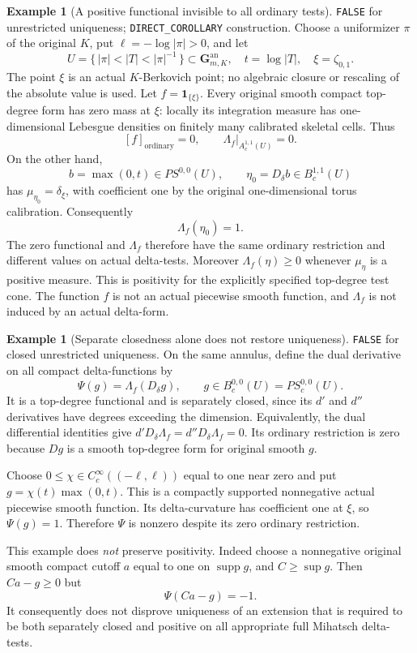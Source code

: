 \documentclass[11pt,a4paper]{article}
\numberwithin{equation}{section}
\theoremstyle{definition}
\newtheorem{example}[theorem]{Example}
\theoremstyle{remark}
\begin{document}
\begin{example}[A positive functional invisible to all ordinary tests]
\label{ex:r6-invisible-positive-delta-functional}
\textnormal{\texttt{FALSE} for unrestricted uniqueness;
\texttt{DIRECT\_COROLLARY} construction.}
Choose a uniformizer $\pi$ of the original $K$, put
$\ell=-\log|\pi|>0$, and let
\[
       U=\{\,|\pi|<|T|<|\pi|^{-1}\,\}\subset\mathbf G_{m,K}^{\mathrm{an}},
       \quad t=\log|T|,\quad \xi=\zeta_{0,1}.
\]
The point $\xi$ is an actual $K$-Berkovich point; no algebraic closure
or rescaling of the absolute value is used.  Let $f=\mathbf1_{\{\xi\}}$.
Every original smooth compact top-degree form has zero mass at
$\xi$: locally its integration measure has one-dimensional Lebesgue
densities on finitely many calibrated skeletal cells.  Thus
\[
                     [f]_{\mathrm{ordinary}}=0,
              \qquad \Lambda_f|_{A_c^{1,1}(U)}=0.
\]
On the other hand,
\[
           b=\max(0,t)\in PS^{0,0}(U),\qquad
           \eta_0=D_\delta b\in B_c^{1,1}(U)
\]
has $\mu_{\eta_0}=\delta_\xi$, with coefficient one by the original
one-dimensional torus calibration.  Consequently
\[
                              \Lambda_f(\eta_0)=1.
\]
The zero functional and $\Lambda_f$ therefore have the same ordinary
restriction and different values on actual delta-tests.  Moreover
$\Lambda_f(\eta)\geq0$ whenever $\mu_\eta$ is a positive measure.
This is positivity for the explicitly specified top-degree test
cone.  The function $f$ is not an actual piecewise smooth function,
and $\Lambda_f$ is not induced by an actual delta-form.
\end{example}

\begin{example}[Separate closedness alone does not restore uniqueness]
\label{ex:r6-invisible-closed-delta-functional}
\textnormal{\texttt{FALSE} for closed unrestricted uniqueness.}
On the same annulus, define the dual derivative on all compact
delta-functions by
\[
                \Psi(g)=\Lambda_f(D_\delta g),
                       \qquad g\in B_c^{0,0}(U)=PS_c^{0,0}(U).
\]
It is a top-degree functional and is separately closed, since its
$d'$ and $d''$ derivatives have degrees exceeding the dimension.
Equivalently, the dual differential identities give
$d'D_\delta\Lambda_f=d''D_\delta\Lambda_f=0$.
Its ordinary restriction is zero because $Dg$ is a smooth
top-degree form for original smooth $g$.

Choose $0\leq\chi\in C_c^\infty((-\ell,\ell))$ equal to one near
zero and put $g=\chi(t)\max(0,t)$.  This is a compactly supported
nonnegative actual piecewise smooth function.  Its delta-curvature
has coefficient one at $\xi$, so $\Psi(g)=1$.  Therefore $\Psi$ is
nonzero despite its zero ordinary restriction.

This example does \emph{not} preserve positivity.  Indeed choose a
nonnegative original smooth compact cutoff $a$ equal to one on
$\operatorname{supp}g$, and $C\geq\sup g$.  Then $Ca-g\geq0$ but
\[
                       \Psi(Ca-g)=-1.
\]
It consequently does not disprove uniqueness of an extension that
is required to be both separately closed and positive on all
appropriate full Mihatsch delta-tests.
\end{example}
\end{document}
